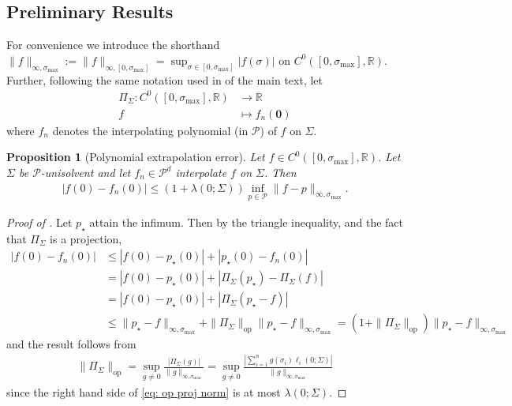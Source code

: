 \documentclass[10pt]{article} %
\newcommand{\nugget}{\sigma}
\newtheorem{proposition}{Proposition}
\begin{document}
\subsection{Preliminary Results}
\label{app: preliminary}

For convenience we introduce the shorthand $\|f\|_{\infty,\nugget_{\max}} := \|f\|_{\infty,[0,\nugget_{\max}]} = \sup_{\nugget \in [0,\nugget_{\max}]} |f(\nugget)|$ on $C^0([0,\nugget_{\max}],\mathbb{R})$.
Further, following the same notation used in  of the main text, let
\begin{align*}
\Pi_\Sigma : C^0([0,\nugget_{\max}],\mathbb{R}) & \rightarrow \mathbb{R} \\
f & \mapsto f_n(\mathbf{0})
\end{align*}
where $f_n$ denotes the interpolating polynomial (in $\mathcal{P}$) of $f$ on $\Sigma$.

\begin{proposition}[Polynomial extrapolation error]
\label{thm: leb}
Let $f \in C^0([0,\nugget_{\max}],\mathbb{R})$.
Let $\Sigma$ be $\mathcal{P}$-unisolvent and let $f_n \in \mathcal{P}^d$ interpolate $f$ on $\Sigma$.
Then 
\begin{align*}
| f(0) - f_n(0) | \leq (1 + \lambda(0 ; \Sigma)) \inf_{p \in \mathcal{P}} \| f - p \|_{\infty,\nugget_{\max}} .
\end{align*}
\end{proposition}
\begin{proof}[Proof of ]
Let $p_\star$ attain the infimum.
Then by the triangle inequality, and the fact that $\Pi_\Sigma$ is a projection,
\begin{align*}
| f(0) - f_n(0) | & \leq | f(0) - p_\star(0) | + | p_\star(0) - f_n(0) |\\
& =  | f(0) - p_\star(0) | + | \Pi_\Sigma( p_\star ) - \Pi_\Sigma ( f ) | \\
& =  | f(0) - p_\star(0) | + | \Pi_\Sigma( p_\star - f ) | \\
& \leq  \| p_\star - f \|_{\infty , \nugget_{\max}} + \|\Pi_\Sigma\|_{\mathrm{op}}  \| p_\star - f \|_{\infty ,\nugget_{\max}}
= (1 + \|\Pi_\Sigma\|_{\mathrm{op}} ) \| p_\star - f \|_{\infty , \nugget_{\max}}
\end{align*}
and the result follows from 
\begin{align}
\|\Pi_\Sigma\|_{\mathrm{op}} = \sup_{g \neq 0} \frac{|\Pi_\Sigma(g)|}{\|g\|_{\infty,\nugget_{\max}}} 
= \sup_{g \neq 0} \frac{| \sum_{i=1}^n g(\sigma_i) \ell_i(0;\Sigma) |}{\|g\|_{\infty,\nugget_{\max}}}    \label{eq: op proj norm}
\end{align}
since the right hand side of \eqref{eq: op proj norm} is at most $\lambda(0 ; \Sigma)$.
\end{proof}
\end{document}
